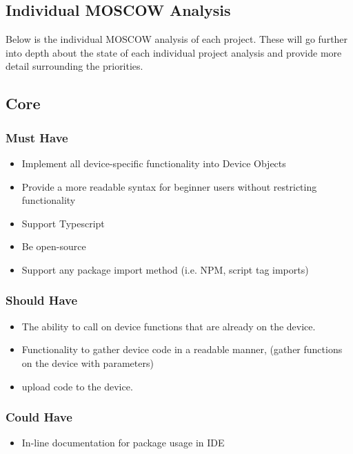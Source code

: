 \documentclass{l4proj}
\begin{document}
%
% 

\begin{appendices}
\chapter{Individual MOSCOW Analysis}


\label{appendix:MOSCOWAnalysis}

Below is the individual MOSCOW analysis of each project. These will go further into depth about the state of each individual project analysis and provide more detail surrounding the priorities.


\section{Core}
\subsection{Must Have}
\begin{itemize}
    \item Implement all device-specific functionality into Device Objects
    \item Provide a more readable syntax for beginner users without restricting functionality
    \item Support Typescript
    \item Be open-source
    \item Support any package import method (i.e. NPM, script tag imports)
\end{itemize}
\subsection{Should Have}
\begin{itemize}
    \item The ability to call on device functions that are already on the device.
    \item Functionality to gather device code in a readable manner, (gather functions on the device with parameters)
    \item upload code to the device.
\end{itemize}
\subsection{Could Have}
\begin{itemize}
    \item In-line documentation for package usage in IDE
\end{itemize}


\end{appendices}
\end{document}
